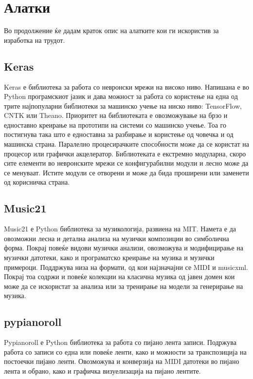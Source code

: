 \chapter{Алатки}
\label{ch:alatki}

Во продолжение ќе дадам краток опис на алатките кои ги искористив за изработка на трудот.

\section{Keras}

Keras е библиотека за работа со невронски мрежи на високо ниво. Напишана е во Python програмскиот јазик и дава можност за работа со користење на една од трите најпопуларни библиотеки за машинско учење на ниско ниво: TensorFlow, CNTK или Theano. Приоритет на библиотеката е овозможување на брзо и едноставно креирање на прототипи на системи со машинско учење. Тоа го постигнува така што е едноставна за разбирање и користење од човечка и од машинска страна. Паралелно процесирачките способности може да се користат на процесор или графички акцелератор. Библиотеката е екстремно модуларна, скоро сите елементи во невронските мрежи се конфигурабилни модули и лесно може да се менуваат. Истите модули се отворени и може да бида проширени или заменети од корисничка страна.

\section{Music21}

Music21 е Python библиотека за музикологија, развиена на MIT. Намета е да овозможни лесна и детална анализа на музички композиции во симболична форма. Покрај повеќе видови музички анализи, овозможува и модифицирање на музички датотеки, како и програматско креирање на музика и музички примероци. Поддржува низа на формати, од кои најзначајни се MIDI и musicxml. Покрај тоа содржи и повеќе колекции на класична музика од јавен домен кои може да се искористат за анализа или за тренирање на модели за генерирање на музика. 

\section{pypianoroll}

Pypianoroll е Python библиотека за работа со пијано лента записи. Подржува работа со записи со една или повеќе ленти, како и можности за транспозиција на постоечки пијано ленти. Овозможува и конверзија на MIDI датотеки во пијано лента и обрано, како и графичка визуелизација на пијано лентите.

